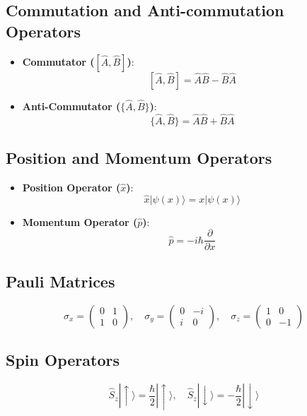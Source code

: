 \documentclass{article}
\theoremstyle{plain}
\begin{document}
\begin{itemize}
\subsection{Commutation and Anti-commutation Operators}
\begin{itemize}
    \item \textbf{Commutator (\([\hat{A}, \hat{B}]\))}:
    \[
    [\hat{A}, \hat{B}] = \hat{A} \hat{B} - \hat{B} \hat{A}
    \]

    \item \textbf{Anti-Commutator (\(\{\hat{A}, \hat{B}\}\))}:
    \[
    \{\hat{A}, \hat{B}\} = \hat{A} \hat{B} + \hat{B} \hat{A}
    \]
\end{itemize}

\subsection{Position and Momentum Operators}
\begin{itemize}
    \item \textbf{Position Operator (\(\hat{x}\))}:
    \[
    \hat{x} |\psi(x)\rangle = x |\psi(x)\rangle
    \]

    \item \textbf{Momentum Operator (\(\hat{p}\))}:
    \[
    \hat{p} = -i\hbar \frac{\partial}{\partial x}
    \]
\end{itemize}

\subsection{Pauli Matrices}
\[
\sigma_x = \begin{pmatrix} 0 & 1 \\ 1 & 0 \end{pmatrix}, \quad
\sigma_y = \begin{pmatrix} 0 & -i \\ i & 0 \end{pmatrix}, \quad
\sigma_z = \begin{pmatrix} 1 & 0 \\ 0 & -1 \end{pmatrix}
\]

\subsection{Spin Operators}
\[
\hat{S}_z |\uparrow\rangle = \frac{\hbar}{2} |\uparrow\rangle, \quad
\hat{S}_z |\downarrow\rangle = -\frac{\hbar}{2} |\downarrow\rangle
\]


\end{itemize}
\end{document}
